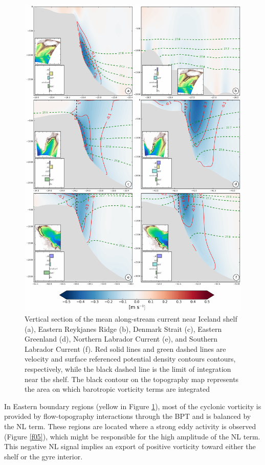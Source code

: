 \documentclass[os, manuscript]{copernicus}
\begin{document}
\begin{figure}[t]
\includegraphics[width=12cm]{../fig_os/f12.pdf}
\caption{Vertical section of the mean along-stream current near Iceland shelf (a), Eastern Reykjanes Ridge (b), Denmark Strait (c), Eastern Greenland (d), Northern Labrador Current (e), and Southern Labrador Current (f). Red solid lines and green dashed lines are velocity and surface referenced potential density contours contours, respectively, while the black dashed line is the limit of integration near the shelf. The black contour on the topography map represents the area on which barotropic vorticity terms are integrated}
\label{f12}
\end{figure} 


In Eastern boundary regions (yellow in Figure \ref{f12}), most of the cyclonic vorticity is provided by flow-topography interactions through the BPT and is balanced by the NL term. These regions are located where a strong eddy activity is observed (Figure \ref{f05}), which might be responsible for the high amplitude of the NL term. This negative NL signal implies an export of positive vorticity toward either the shelf or the gyre interior. 
\end{document}
